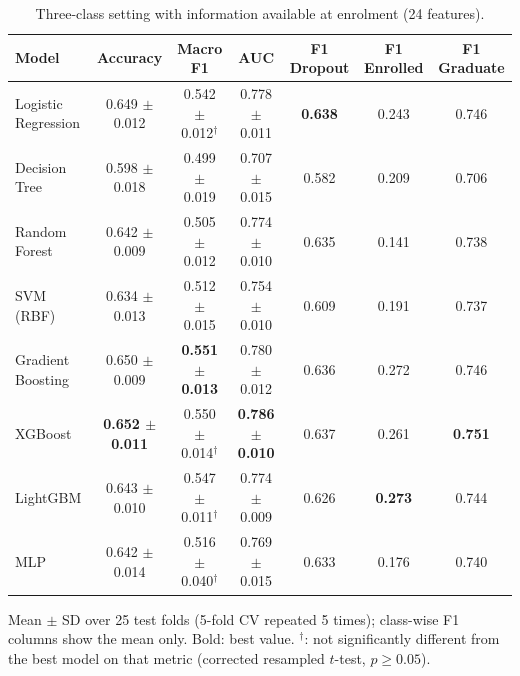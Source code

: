 \begin{table}[H]
\centering
\small
\setlength{\tabcolsep}{3.5pt}
\caption{Three-class setting with information available at enrolment (24 features).}
\label{tab:enrol}
\begin{tabular}{lcccccc}
\toprule
Model & Accuracy & Macro F1 & AUC & F1 Dropout & F1 Enrolled & F1 Graduate \\
\midrule
Logistic Regression & 0.649 $\pm$ 0.012 & 0.542 $\pm$ 0.012$^{\dagger}$ & 0.778 $\pm$ 0.011 & \textbf{0.638} & 0.243 & 0.746 \\
Decision Tree & 0.598 $\pm$ 0.018 & 0.499 $\pm$ 0.019 & 0.707 $\pm$ 0.015 & 0.582 & 0.209 & 0.706 \\
Random Forest & 0.642 $\pm$ 0.009 & 0.505 $\pm$ 0.012 & 0.774 $\pm$ 0.010 & 0.635 & 0.141 & 0.738 \\
SVM (RBF) & 0.634 $\pm$ 0.013 & 0.512 $\pm$ 0.015 & 0.754 $\pm$ 0.010 & 0.609 & 0.191 & 0.737 \\
Gradient Boosting & 0.650 $\pm$ 0.009 & \textbf{0.551 $\pm$ 0.013} & 0.780 $\pm$ 0.012 & 0.636 & 0.272 & 0.746 \\
XGBoost & \textbf{0.652 $\pm$ 0.011} & 0.550 $\pm$ 0.014$^{\dagger}$ & \textbf{0.786 $\pm$ 0.010} & 0.637 & 0.261 & \textbf{0.751} \\
LightGBM & 0.643 $\pm$ 0.010 & 0.547 $\pm$ 0.011$^{\dagger}$ & 0.774 $\pm$ 0.009 & 0.626 & \textbf{0.273} & 0.744 \\
MLP & 0.642 $\pm$ 0.014 & 0.516 $\pm$ 0.040$^{\dagger}$ & 0.769 $\pm$ 0.015 & 0.633 & 0.176 & 0.740 \\
\bottomrule
\end{tabular}
\par\smallskip\footnotesize Mean $\pm$ SD over 25 test folds (5-fold CV repeated 5 times); class-wise F1 columns show the mean only. Bold: best value. $^{\dagger}$: not significantly different from the best model on that metric (corrected resampled $t$-test, $p\ge 0.05$).
\end{table}

